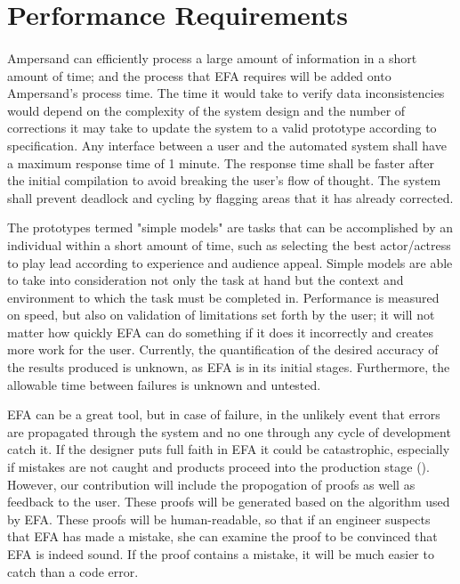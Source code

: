 \documentclass[12pt]{report}
\begin{document}

\section{Performance Requirements}\label{sec:Performance}
\paragraph*{}
Ampersand can efficiently process a large amount of information in a short 
amount of time; and the process that EFA requires will be added onto 
Ampersand’s process time. The time it would take to verify data inconsistencies 
would depend on the complexity of the system design and the number of 
corrections it may take to update the system to a valid prototype according to 
specification. Any interface between a user and the automated system shall have 
a maximum response time of 1 minute. The response time shall be faster after 
the initial compilation to avoid breaking the user's flow of thought. The 
system shall prevent deadlock and cycling by flagging areas that it has already 
corrected. 

The prototypes termed "simple models" are tasks that can be accomplished by an 
individual within a short amount of 
time, such as selecting the best actor/actress to play lead according to 
experience and audience appeal. Simple models are able to take into 
consideration not only the task at hand but the context 
and environment to which the task must be completed in. Performance is measured 
on speed, but also on validation of limitations set forth by the user; it will 
not matter how quickly EFA can do something if it does it incorrectly and 
creates more work for the user. Currently, the quantification of the desired 
accuracy of the results produced is unknown, as EFA is in its initial stages. 
Furthermore, the allowable time between failures is unknown and untested.

EFA can be a great tool, but in case of failure, in the unlikely event that 
errors are propagated through the system and no one through any cycle of 
development catch it. If the designer puts full faith in EFA it could be 
catastrophic, especially if mistakes are not caught and products proceed into 
the production stage (\cite[153]{RBD}). However, our contribution will include 
the propogation of proofs as well as feedback to the user. These proofs
will be generated based on the algorithm used by EFA. These proofs will be
human-readable, so that if an engineer suspects that EFA has made a mistake, she
can examine the proof to be convinced that EFA is indeed sound. If the proof
contains a mistake, it will be much easier to catch than a code error. 
\end{document}
